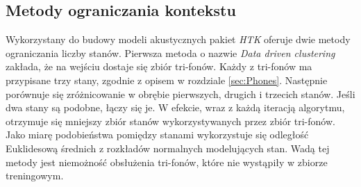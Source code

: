\documentclass[11pt]{article}
\begin{document}
	\subsection{Metody ograniczania kontekstu}
	\label{sec:state_red}
	Wykorzystany do budowy modeli akustycznych pakiet \textit{HTK} oferuje dwie metody ograniczania liczby stanów. Pierwsza metoda o nazwie \textit{Data driven clustering} zakłada, że na wejściu dostaje się zbiór tri-fonów. Każdy z tri-fonów ma przypisane trzy stany, zgodnie z opisem w rozdziale \ref{sec:Phones}. Następnie porównuje się zróżnicowanie w obrębie pierwszych, drugich i trzecich stanów. Jeśli dwa stany są podobne, łączy się je. W efekcie, wraz z każdą iteracją algorytmu, otrzymuje się mniejszy zbiór stanów wykorzystywanych przez zbiór tri-fonów. Jako miarę podobieństwa pomiędzy stanami wykorzystuje się odległość Euklidesową średnich z rozkładów normalnych modelujących stan. Wadą tej metody jest niemożność obsłużenia tri-fonów, które nie wystąpiły w zbiorze treningowym.
	
\end{document}
